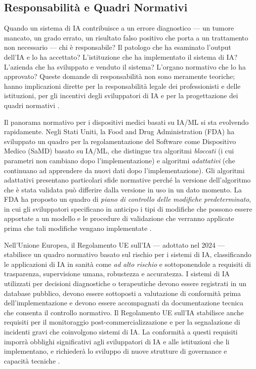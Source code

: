 \subsection{Responsabilità e Quadri Normativi}

Quando un sistema di IA contribuisce a un errore diagnostico — un tumore mancato, un grado errato, un risultato falso positivo che porta a un trattamento non necessario — chi è responsabile? Il patologo che ha esaminato l'output dell'IA e lo ha accettato? L'istituzione che ha implementato il sistema di IA? L'azienda che ha sviluppato e venduto il sistema? L'organo normativo che lo ha approvato? Queste domande di responsabilità non sono meramente teoriche; hanno implicazioni dirette per la responsabilità legale dei professionisti e delle istituzioni, per gli incentivi degli sviluppatori di IA e per la progettazione dei quadri normativi \cite{elendu2023}.

Il panorama normativo per i dispositivi medici basati su IA/ML si sta evolvendo rapidamente. Negli Stati Uniti, la Food and Drug Administration (FDA) ha sviluppato un quadro per la regolamentazione del Software come Dispositivo Medico (SaMD) basato su IA/ML, che distingue tra algoritmi \emph{bloccati} (i cui parametri non cambiano dopo l'implementazione) e algoritmi \emph{adattativi} (che continuano ad apprendere da nuovi dati dopo l'implementazione). Gli algoritmi adattativi presentano particolari sfide normative perché la versione dell'algoritmo che è stata validata può differire dalla versione in uso in un dato momento. La FDA ha proposto un quadro di \emph{piano di controllo delle modifiche predeterminato}, in cui gli sviluppatori specificano in anticipo i tipi di modifiche che possono essere apportate a un modello e le procedure di validazione che verranno applicate prima che tali modifiche vengano implementate \cite{zhang2023}.

Nell'Unione Europea, il Regolamento UE sull'IA — adottato nel 2024 — stabilisce un quadro normativo basato sul rischio per i sistemi di IA, classificando le applicazioni di IA in sanità come \emph{ad alto rischio} e sottoponendole a requisiti di trasparenza, supervisione umana, robustezza e accuratezza. I sistemi di IA utilizzati per decisioni diagnostiche o terapeutiche devono essere registrati in un database pubblico, devono essere sottoposti a valutazione di conformità prima dell'implementazione e devono essere accompagnati da documentazione tecnica che consenta il controllo normativo. Il Regolamento UE sull'IA stabilisce anche requisiti per il monitoraggio post-commercializzazione e per la segnalazione di incidenti gravi che coinvolgono sistemi di IA. La conformità a questi requisiti imporrà obblighi significativi agli sviluppatori di IA e alle istituzioni che li implementano, e richiederà lo sviluppo di nuove strutture di governance e capacità tecniche \cite{zhang2023}.

